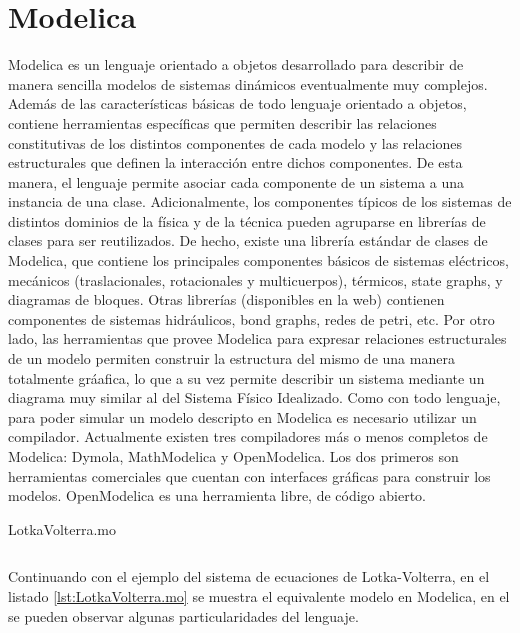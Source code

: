 \section{Modelica}

	Modelica\cite{Fri98}\cite{Fritzson02modelica} es un lenguaje orientado a objetos desarrollado para describir de manera sencilla modelos de sistemas dinámicos eventualmente muy complejos.
	Además de las características básicas de todo lenguaje orientado a objetos, contiene herramientas específicas que permiten describir las relaciones
	constitutivas de los distintos componentes de cada modelo y las relaciones estructurales que definen la interacción entre dichos componentes.
	De esta manera, el lenguaje permite asociar cada componente de un sistema a una instancia de una clase.
	Adicionalmente, los componentes típicos de los sistemas de distintos dominios de la física y de la técnica pueden agruparse en librerías de clases para ser
	reutilizados. De hecho, existe una librería estándar de clases de Modelica, que contiene los principales componentes básicos de sistemas eléctricos,
	mecánicos (traslacionales, rotacionales y multicuerpos), térmicos, state graphs, y diagramas de bloques. 
	Otras librerías (disponibles en la web) contienen componentes de sistemas hidráulicos, bond graphs, redes de petri, etc.
	Por otro lado, las herramientas que provee Modelica para expresar relaciones estructurales de un modelo permiten construir la estructura del mismo de una
	manera totalmente gráafica, lo que a su vez permite describir un sistema mediante un diagrama muy similar al del Sistema Físico Idealizado.
	Como con todo lenguaje, para poder simular un modelo descripto en Modelica es necesario utilizar un compilador. Actualmente existen tres compiladores
	más o menos completos de Modelica: Dymola, MathModelica y OpenModelica. Los dos primeros son herramientas comerciales que cuentan con interfaces
	gráficas para construir los modelos. OpenModelica es una herramienta libre, de código abierto.

\begin{listing}[H]    
	\caption{LotkaVolterra.mo}
	\inputminted[linenos]{modelica}{src/LotkaVolterra.mo}
	\label{lst:LotkaVolterra.mo}
\end{listing}
	
	Continuando con el ejemplo del sistema de ecuaciones de Lotka-Volterra, en el listado \ref{lst:LotkaVolterra.mo} se muestra el equivalente modelo en Modelica, 
	en el se pueden observar algunas particularidades del lenguaje.
	
